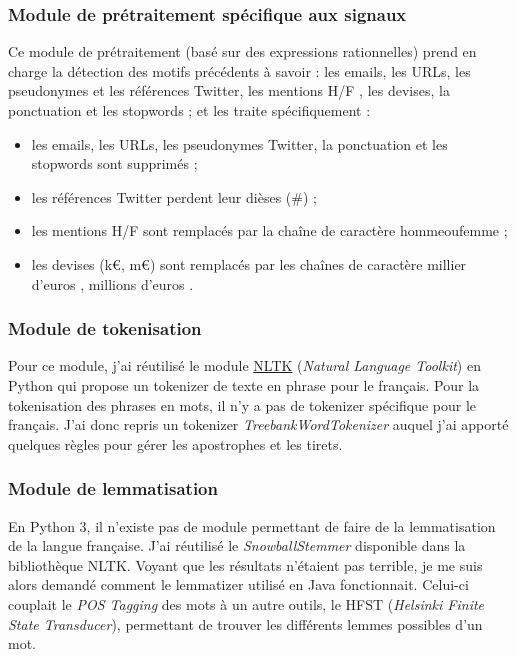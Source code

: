         \subsubsection{Module de prétraitement spécifique aux signaux}
            Ce module de prétraitement (basé sur des expressions rationnelles) prend en charge la détection des motifs précédents à savoir : les emails, les URLs, les pseudonymes et les références Twitter, les mentions \og H/F \fg, les devises, la ponctuation et les stopwords ; et les traite spécifiquement :
            \begin{itemize}
                \item les emails, les URLs, les pseudonymes Twitter, la ponctuation et les stopwords sont supprimés ;
                \item les références Twitter perdent leur dièses (\#) ;
                \item les mentions \og H/F \fg  sont remplacés par la chaîne de caractère \og hommeoufemme \fg ;
                \item les devises (k€, m€) sont remplacés par les chaînes de caractère \og millier d'euros \fg, \og millions d'euros \fg.
            \end{itemize}

        \subsubsection{Module de tokenisation}
            Pour ce module, j'ai réutilisé le module \href{http://www.nltk.org/}{NLTK} (\textit{Natural Language Toolkit}) en Python qui propose un tokenizer de texte en phrase pour le français. Pour la tokenisation des phrases en mots, il n'y a pas de tokenizer spécifique pour le français. J'ai donc repris un tokenizer \textit{TreebankWordTokenizer} auquel j'ai apporté quelques règles pour gérer les apostrophes et les tirets.

        \subsubsection{Module de lemmatisation}
            En Python 3, il n'existe pas de module permettant de faire de la lemmatisation de la langue française. J'ai réutilisé le \textit{SnowballStemmer} disponible dans la bibliothèque NLTK. Voyant que les résultats n'étaient pas terrible, je me suis alors demandé comment le lemmatizer utilisé en Java fonctionnait. Celui-ci couplait le \textit{POS Tagging} des mots à un autre outils, le HFST (\textit{Helsinki Finite State Transducer}), permettant de trouver les différents lemmes possibles d'un mot.\\

